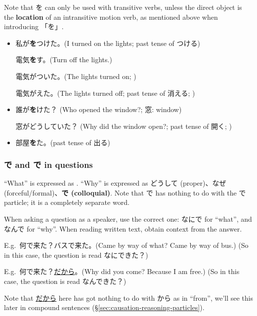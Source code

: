 \documentclass[../nihongo-gakushuu-kyouzai.tex]{subfiles}
\begin{document}
Note that を can only be used with transitive verbs, unless the direct object is the \textbf{location} of an intransitive motion verb, as mentioned above when introducing 「を」.
\begin{itemize}
    \item 私が\textbf{を}つけた。(I turned on the lights; past tense of つける)

    電気\textbf{を}す。(Turn off the lights.)

    電気がついた。(The lights turned on; )

    電気がえた。(The lights turned off; past tense of 消える; )
    \item 誰が\textbf{を}けた？ (Who opened the window?; 窓: window)

    窓がどうしていた？ (Why did the window open?; past tense of 開く; )
    \item 部屋\textbf{を}た。(past tense of 出る)
\end{itemize}

\subsubsection{で and で in questions}
``What'' is expressed as \textbf{}. ``Why'' is expressed as どうして (proper)、なぜ (forceful/formal)、\textbf{で (colloquial)}. Note that で has nothing to do with the で particle; it is a completely separate word.

When asking a question as a speaker, use the correct one: なにで for ``what'', and なんで for ``why''. When reading written text, obtain context from the answer. 

E.g.\ 何で来た？バスで来た。(Came by way of what? Came by  way of bus.) (So in this case, the question is read なにできた？)

E.g.\ 何で来た？\underline{だから}。(Why did you come? Because I am free.) (So in this case, the question is read なんできた？)

Note that \underline{だから} here has got nothing to do with から as in ``from'', we'll see this later in compound sentences (\S\ref{sec:causation-reasoning-particles}).
\end{document}
